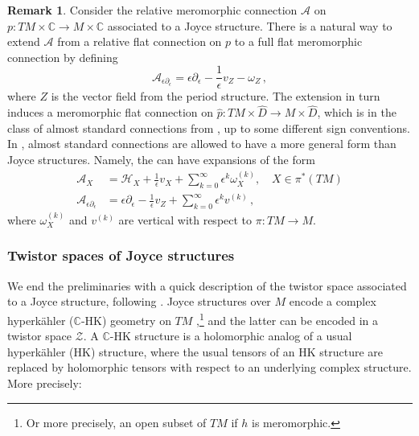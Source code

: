 \documentclass{article}
\theoremstyle{definition}
\newtheorem{remark}[theorem]{Remark}
\numberwithin{equation}{section}
\begin{document}
\begin{remark}\label{extremark}
Consider the relative meromorphic connection $\mathcal{A}$ on $p:TM\times \mathbb{C}\to M\times \mathbb{C}$ associated to a Joyce structure. There is a natural way to extend $\mathcal{A}$ from a relative flat connection on $p$ to a full flat meromorphic connection by defining 
\begin{equation}\label{epsilonext}
    \mathcal{A}_{\epsilon \partial_{\epsilon}}=\epsilon\partial_{\epsilon}-\frac{1}{\epsilon}v_Z - \omega_Z\,,
\end{equation}
where $Z$ is the vector field from the period structure. The extension in turn induces a meromorphic flat connection on $\hat{p}:TM\times \widehat{D}\to M\times \widehat{D}$, which is in the class of almost standard connections from \cite[Section 5.2]{KSresurgence}, up to some different sign conventions. In \cite[Section 5.2]{KSresurgence}, almost standard connections are allowed to have a more general form than Joyce structures. Namely, the can have expansions of the form
\begin{equation*}
\begin{split}
    \mathcal{A}_X&=\mathcal{H}_X+\frac{1}{\epsilon}v_X+\sum_{k=0}^{\infty}\epsilon^k\omega_X^{(k)}, \quad X\in \pi^*(TM)\\
    \mathcal{A}_{\epsilon\partial_{\epsilon}}&=\epsilon\partial_{\epsilon}-\frac{1}{\epsilon}v_Z + \sum_{k=0}^{\infty}\epsilon^kv^{(k)}\,,
\end{split}
\end{equation*}
where $\omega_X^{(k)}$ and $v^{(k)}$ are vertical with respect to $\pi:TM\to M$.    
\end{remark}

\subsubsection{Twistor spaces of Joyce structures}\label{twistorJoycesec}

We end the preliminaries with a quick description of the twistor space associated to a Joyce structure, following \cite{TwistorJoyce}. Joyce structures over $M$ encode a complex hyperk\"{a}hler ($\mathbb{C}$-HK) geometry on $TM$ \cite{BriStr},\footnote{Or more precisely, an open subset of $TM$ if $h$ is meromorphic.} and the latter can be encoded in a twistor space $\mathcal{Z}$. A $\mathbb{C}$-HK structure is a holomorphic analog of a usual hyperk\"ahler (HK) structure, where the usual tensors of an HK structure are replaced by holomorphic tensors with respect to an underlying complex structure. More precisely:
\end{document}
